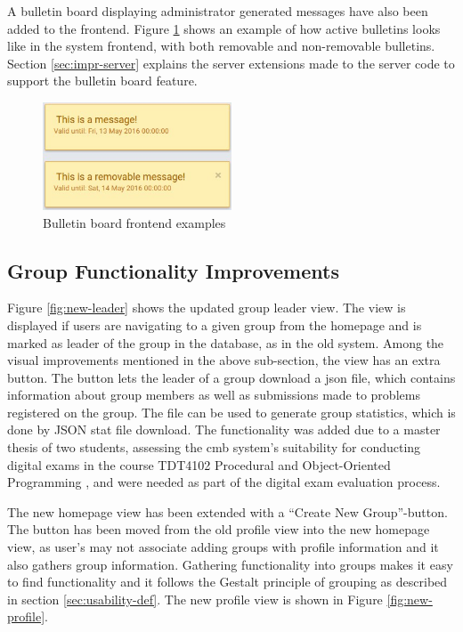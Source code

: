 A bulletin board displaying administrator generated messages have also been added to the frontend. Figure \ref{fig:bulletin-view} shows an example of how active bulletins looks like in the system frontend, with both removable and non-removable bulletins. Section \ref{sec:impr-server} explains the server extensions made to the server code to support the bulletin board feature.

\begin{figure}
    \centering
    \includegraphics[width=0.5\textwidth]{figs/bulletin_view.jpg}
    \caption[Bulletin board frontend examples]{Bulletin board frontend examples}
    \label{fig:bulletin-view}
\end{figure}

\subsection{Group Functionality Improvements}
Figure \ref{fig:new-leader} shows the updated group leader view. The view is displayed if users are navigating to a given group from the homepage and is marked as leader of the group in the database, as in the old system. Among the visual improvements mentioned in the above sub-section, the view has an extra button. The button lets the leader of a group download a \gls{json} file, which contains information about group members as well as submissions made to problems registered on the group. The file can be used to generate group statistics, which is done by
JSON stat file download. The functionality was added due to a master thesis of two students, assessing the \gls{cmb} system's suitability for conducting digital exams in the course TDT4102 Procedural and Object-Oriented Programming \cite{TDT4102}, and were needed as part of the digital exam evaluation process.

The new homepage view has been extended with a ``Create New Group''-button. The button has been moved from the old profile view into the new homepage view, as user's may not associate adding groups with profile information and it also gathers group information. Gathering functionality into groups makes it easy to find functionality and it follows the Gestalt principle of grouping as described in section \ref{sec:usability-def}. The new profile view is shown in Figure \ref{fig:new-profile}.

